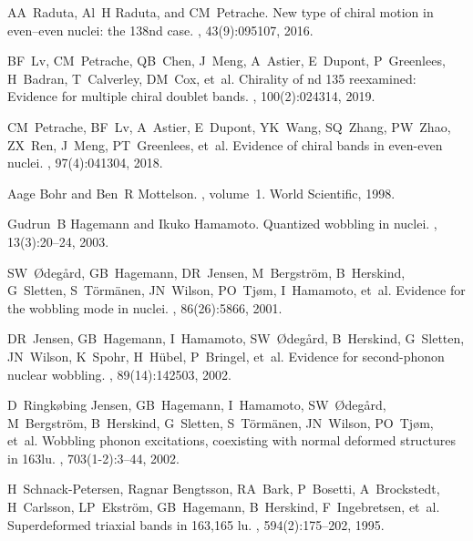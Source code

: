 \documentclass[11pt]{article}
\begin{document}
\begin{thebibliography}{99}
AA~Raduta, Al~H Raduta, and CM~Petrache.
\newblock New type of chiral motion in even--even nuclei: the 138nd case.
, 43(9):095107, 2016.

BF~Lv, CM~Petrache, QB~Chen, J~Meng, A~Astier, E~Dupont, P~Greenlees, H~Badran,
  T~Calverley, DM~Cox, et~al.
\newblock Chirality of nd 135 reexamined: Evidence for multiple chiral doublet
  bands.
, 100(2):024314, 2019.

CM~Petrache, BF~Lv, A~Astier, E~Dupont, YK~Wang, SQ~Zhang, PW~Zhao, ZX~Ren,
  J~Meng, PT~Greenlees, et~al.
\newblock Evidence of chiral bands in even-even nuclei.
, 97(4):041304, 2018.

Aage Bohr and Ben~R Mottelson.
, volume~1.
\newblock World Scientific, 1998.

Gudrun~B Hagemann and Ikuko Hamamoto.
\newblock Quantized wobbling in nuclei.
, 13(3):20--24, 2003.

SW~{\O}deg{\aa}rd, GB~Hagemann, DR~Jensen, M~Bergstr{\"o}m, B~Herskind,
  G~Sletten, S~T{\"o}rm{\"a}nen, JN~Wilson, PO~Tj{\o}m, I~Hamamoto, et~al.
\newblock Evidence for the wobbling mode in nuclei.
, 86(26):5866, 2001.

DR~Jensen, GB~Hagemann, I~Hamamoto, SW~{\O}deg{\aa}rd, B~Herskind, G~Sletten,
  JN~Wilson, K~Spohr, H~H{\"u}bel, P~Bringel, et~al.
\newblock Evidence for second-phonon nuclear wobbling.
, 89(14):142503, 2002.

D~Ringk{\o}bing Jensen, GB~Hagemann, I~Hamamoto, SW~{\O}deg{\aa}rd,
  M~Bergstr{\"o}m, B~Herskind, G~Sletten, S~T{\"o}rm{\"a}nen, JN~Wilson,
  PO~Tj{\o}m, et~al.
\newblock Wobbling phonon excitations, coexisting with normal deformed
  structures in 163lu.
, 703(1-2):3--44, 2002.

H~Schnack-Petersen, Ragnar Bengtsson, RA~Bark, P~Bosetti, A~Brockstedt,
  H~Carlsson, LP~Ekstr{\"o}m, GB~Hagemann, B~Herskind, F~Ingebretsen, et~al.
\newblock Superdeformed triaxial bands in 163,165 lu.
, 594(2):175--202, 1995.


\end{thebibliography}
\end{document}
